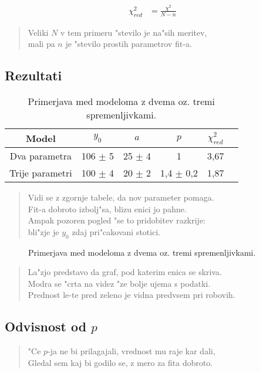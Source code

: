 \documentclass[a4paper,10pt]{article}
\begin{document}
\begin{align}
 \chi^2_{red} &= \frac{\chi^2}{N-n}
\end{align}

\begin{verse}
 Veliki $N$ v tem primeru "stevilo je na"sih meritev, \\
 mali pa $n$ je "stevilo prostih parametrov fit-a. 
\end{verse}

\subsection{Rezultati}

\begin{table}[h]
 \centering
\begin{tabular}{|c|c|c|c|c|c|}
 \hline
  Model & $y_0$ & $a$ & $p$ & $\chi^2_{red}$ \\
\hline
  Dva parametra & 106 $\pm$ 5 & 25 $\pm$ 4 & 1 & 3,67 \\
\hline
  Trije parametri & 100 $\pm$ 4 & 20 $\pm$ 2 & 1,4 $\pm$ 0,2 & 1,87 \\
\hline
\end{tabular}
\caption{Primerjava med modeloma z dvema oz. tremi spremenljivkami. }
\label{tab:farmacija}
\end{table}

\begin{verse}
Vidi se z zgornje tabele, da nov parameter pomaga. \\
Fit-a dobroto izbolj"sa, blizu enici jo pahne. \\
Ampak pozoren pogled "se to pridobitev razkrije: \\
bli"zje je $y_0$ zdaj pri"cakovani stotici. 
\end{verse}

\begin{figure}
 
  \caption{Primerjava med modeloma z dvema oz. tremi spremenljivkami. }
  \label{fig:farmacija}
\end{figure}

\begin{verse}
 La"zjo predstavo da graf, pod katerim enica se skriva. \\
 Modra se "crta na videz "ze bolje ujema s podatki. \\
 Prednost le-te pred zeleno je vidna predvsem pri robovih. 
\end{verse}

\subsection{Odvisnost od $p$}
\begin{verse}
 "Ce $p$-ja ne bi prilagajali, vrednost mu raje kar dali, \\
 Gledal sem kaj bi godilo se, z mero za fita dobroto. 
\end{verse}
\end{document}
